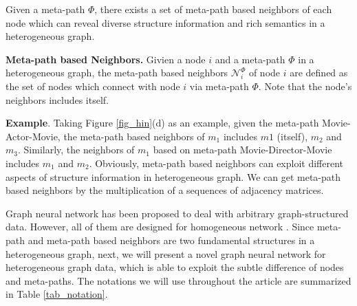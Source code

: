 Given a meta-path $\Phi$, there exists a set of meta-path based neighbors of each node which can reveal diverse structure information and rich semantics in a heterogeneous graph. 
\begin{definition}\textbf{Meta-path based Neighbors.}
	Givien a node $i$ and a meta-path $\Phi$ in a heterogeneous graph, the meta-path based neighbors $\mathcal{N}_i^{\Phi}$ of node $i$ are defined as the set of nodes which connect with node $i$ via meta-path $\Phi$. Note that the node's neighbors includes itself.
\end{definition}
\textbf{Example}. Taking Figure \ref{fig_hin}(d) as an example, given the meta-path Movie-Actor-Movie, the meta-path based neighbors of $m_1$ includes $m1$ (itself), $ m_2$ and $m_3$. Similarly, the neighbors of $m_1$ based on meta-path Movie-Director-Movie includes $m_1$ and  $m_2$. Obviously, meta-path based neighbors can exploit different aspects of structure information in heterogeneous graph. We can get meta-path based neighbors by
the multiplication of a sequences of adjacency matrices.


Graph neural network has been proposed to deal with arbitrary graph-structured data. However, all of them are designed for homogeneous network \cite{gcn,gat}. Since meta-path and meta-path based neighbors are two fundamental structures in a heterogeneous graph, next, we will present a novel graph neural network for heterogeneous graph data, which is able to exploit the subtle difference of nodes and meta-paths. The notations we will use throughout the article are summarized in Table \ref{tab_notation}.

